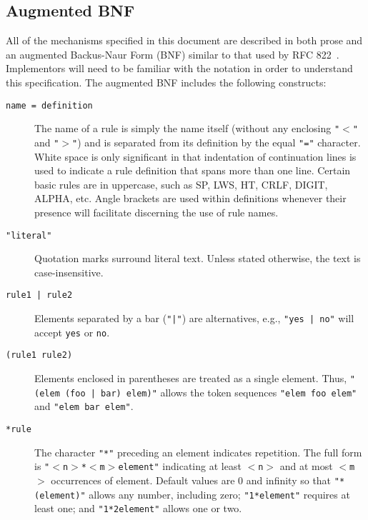 

\subsection{Augmented BNF}
All of the mechanisms specified in this document are described in both prose
and an augmented Backus-Naur Form (BNF) similar to that used by RFC
822~\cite{rfc822}. Implementors will need to be familiar with the notation in
order to understand this specification. The augmented BNF includes the
following constructs:

\begin{description}
  
\item [\texttt{name = definition}] The name of a rule is simply the name
  itself (without any enclosing \texttt{"$<$"} and \texttt{"$>$"}) and is
  separated from its definition by the equal \texttt{"="} character. White
  space is only significant in that indentation of continuation lines is used
  to indicate a rule definition that spans more than one line. Certain basic
  rules are in uppercase, such as SP, LWS, HT, CRLF, DIGIT, ALPHA, etc. Angle
  brackets are used within definitions whenever their presence will
  facilitate discerning the use of rule names.
  
\item [\texttt{"literal"}] Quotation marks surround literal text. Unless
  stated otherwise, the text is case-insensitive.
      
\item [\texttt{rule1 | rule2}] Elements separated by a bar (\texttt{"|"}) are
  alternatives, e.g., \texttt{"yes | no"} will accept \texttt{yes} or
  \texttt{no}.
  
\item [\texttt{(rule1 rule2)}] Elements enclosed in parentheses are treated
  as a single element.  Thus, \texttt{"(elem (foo | bar) elem)"} allows the
  token sequences \texttt{"elem foo elem"} and \texttt{"elem bar elem"}.
  
\item [\texttt{*rule}] The character \texttt{"*"} preceding an element
  indicates repetition. The full form is \texttt{"$<$n$>$*$<$m$>$element"}
  indicating at least \texttt{$<$n$>$} and at most \texttt{$<$m$>$}
  occurrences of element. Default values are 0 and infinity so that
  \texttt{"*(element)"} allows any number, including zero;
  \texttt{"1*element"} requires at least one; and \texttt{"1*2element"}
  allows one or two.
  

\end{description}

